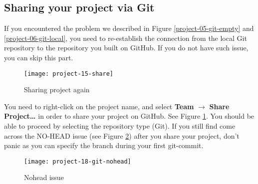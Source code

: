 \subsection{Sharing your project via Git}

If you encountered the problem we described in Figure \ref{project-05-git-empty}
and \ref{project-06-git-local}, you need to re-establish the connection from the
local Git repository to the repository you built on GitHub. If you do not have
such issue, you can skip this part.

\begin{figure}[t]
\centering
\texttt{[image: project-15-share]}
\caption{Sharing project again\label{project-15-share}}
\end{figure}

You need to right-click on the project name, and select \textbf{Team}
$\rightarrow$ \textbf{Share Project\ldots} in order to share your project on
GitHub. See Figure \ref{project-15-share}. You should be able to proceed by
selecting the repository type (Git). If you still find come across the NO-HEAD
issue (see Figure \ref{project-18-git-nohead}) after you share your project,
don't panic as you can specify the branch during your first git-commit.

\begin{figure}[t]
\centering
\texttt{[image: project-18-git-nohead]}
\caption{Nohead issue\label{project-18-git-nohead}}
\end{figure}

